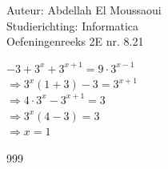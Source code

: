 \documentclass[a4paper]{article}
\begin{document}
  
\noindent \large Auteur: Abdellah El Moussaoui \\
\noindent \large Studierichting: Informatica\\
\noindent \large Oefeningenreeks 2E nr. 8.21\\

\medskip

\normalsize

$-3 + 3^x + 3^{x+1} = 9 \cdot 3^{x-1}$\\

$\Rightarrow 3^x \left(1 + 3\right) - 3 = 3^{x+1}$ \\

$\Rightarrow 4 \cdot 3^x - 3^{x+1}=  3$ \\

$\Rightarrow 3^x \left(4-3\right)=  3$ \\

$\Rightarrow \boxed{x = 1}$\\


\begin{thebibliography}{999}
\end{thebibliography}
\end{document}
